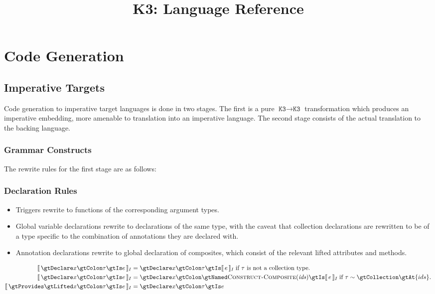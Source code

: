 \documentclass{article}
\title{K3: Language Reference}
\author{}
\date{}
\newcommand{\K}{\texttt{K3}}
\begin{document}
    \maketitle

    \tableofcontents

    \section{Code Generation}
    \subsection{Imperative Targets}

    Code generation to imperative target languages is done in two stages. The first is a pure $\K
    \rightarrow \K$ transformation which produces an imperative embedding, more amenable to
    translation into an imperative language. The second stage consists of the actual translation to
    the backing language.

    \subsubsection{Grammar Constructs}

    The rewrite rules for the first stage are as follows:

    \subsubsection{Declaration Rules}

    \begin{itemize}
        \item Triggers rewrite to functions of the corresponding argument types.
        \item Global variable declarations rewrite to declarations of the same type, with the caveat
            that collection declarations are rewritten to be of a type specific to the combination
            of annotations they are declared with.
        \item Annotation declarations rewrite to global declaration of composites, which consist of
            the relevant lifted attributes and methods.
    \end{itemize}
%
    \begin{align}
        \intI{\gtDeclare x \gtColon \tau \gtIs e}
            &= \gtDeclare x \gtColon \tau \gtIs \intI{e}
            \; \text{if $\tau$ is not a collection type.} \\
        \intI{\gtDeclare x \gtColon \tau \gtIs e}
            &= \gtDeclare x \gtColon \gtNamed \ConstructComposite{ids} \gtIs \intI{e}
            \; \text{if $\tau \sim \gtCollection \gtAt \{ids\}$.} \\
        \intI{\gtProvides \gtLifted x \gtColon \tau \gtIs e}
            &= \gtDeclare x \gtColon \tau \gtIs e
    \end{align}
\end{document}
